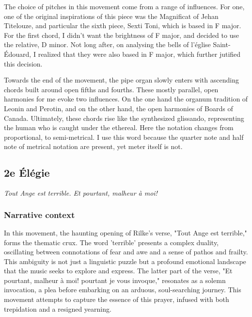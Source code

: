 \documentclass[12pt,twoside,maitrise]{dms}
\theoremstyle{definition}
\begin{document}

The choice of pitches in this movement come from a range of influences.
For one, one of the original inspirations of this piece was the Magnificat of Jehan Titelouze, and particular the sixth piece, Sexti Toni, which is based in F major.
For the first chord, I didn't want the brightness of F major, and decided to use the relative, D minor.
Not long after, on analysing the bells of l'église Saint-Édouard, I realized that they were also based in F major, which further jutified this decision.

Towards the end of the movement, the pipe organ slowly enters with ascending chords built around open fifths and fourths.
These mostly parallel, open harmonies for me evoke two influences.
On the one hand the organum tradition of Leonin and Perotin, and on the other hand, the open harmonies of Boards of Canada.
Ultimately, these chords rise like the synthesized glissando, representing the human who is caught under the ethereal.
Here the notation changes from proportional, to semi-metrical.
I use this word because the quarter note and half note of metrical notation are present, yet meter itself is not.


\subsection{2e Élégie}

\epigraph{\textit{Tout Ange est terrible.
Et pourtant, malheur à moi!}}{}

\subsubsection{Narrative context}

In this movement, the haunting opening of Rilke's verse, "Tout Ange est terrible," forms the thematic crux.
The word 'terrible' presents a complex duality, oscillating between connotations of fear and awe and a sense of pathos and frailty.
This ambiguity is not just a linguistic puzzle but a profound emotional landscape that the music seeks to explore and express.
The latter part of the verse, "Et pourtant, malheur à moi!
pourtant je vous invoque," resonates as a solemn invocation, a plea before embarking on an arduous, soul-searching journey.
This movement attempts to capture the essence of this prayer, infused with both trepidation and a resigned yearning.
\end{document}
